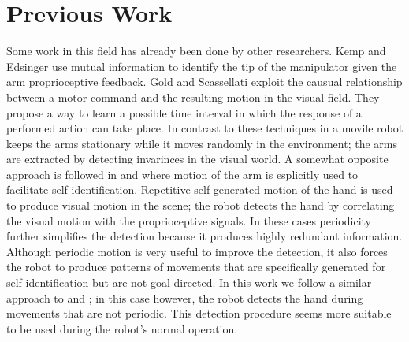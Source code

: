 \section{Previous Work}\label{prev-work}

Some work in this field has already been done by other researchers.
Kemp and Edsinger \cite{WCIC06new} use mutual information to 
identify the tip of the manipulator given the arm proprioceptive feedback.
Gold and Scassellati \cite{LAWC06} exploit the causual relationship between 
a motor command and the resulting motion in the visual field. They propose
a way to learn a possible time interval in which the response of a performed
action can take place. In contrast to these techniques 
in \cite{DIMMRBS03-03} a movile robot keeps the arms stationary while it moves 
randomly in the environment; the arms are extracted by detecting invarinces
in the visual world. A somewhat opposite approach is followed in 
\cite{HRDAG04} and \cite{LAOTA03} where motion of the arm is esplicitly 
used to facilitate self-identification. Repetitive self-generated motion of 
the hand is used to produce visual motion in the scene; the robot detects 
the hand by correlating the visual motion with the proprioceptive signals.
In these cases periodicity further simplifies the detection because it produces
highly redundant information. Although periodic motion is very useful 
to improve the detection, it also forces the robot to produce patterns of 
movements that are specifically generated for self-identification but are not 
goal directed. In this work we follow a similar approach to \cite{HRDAG04} 
and \cite{LAOTA03}; in this case however, the robot detects the hand during
movements that are not periodic. This detection procedure seems more suitable
to be used during the robot's normal operation.


